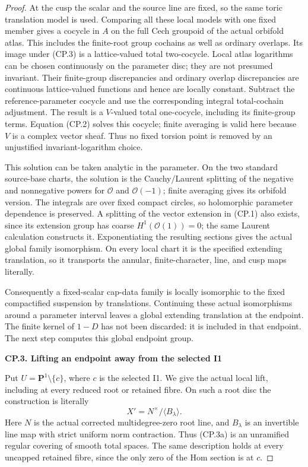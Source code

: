 \begin{proof}
At the cusp the scalar and the source line are fixed, so the same
toric translation model is used. Comparing all these local models
with one fixed member gives a cocycle in \(A\) on the full Cech
groupoid of the actual orbifold atlas. This includes the finite-root
group cochains as well as ordinary overlaps. Its image under (CP.3)
is a lattice-valued total two-cocycle. Local atlas logarithms can be
chosen continuously on the parameter disc; they are not presumed
invariant. Their finite-group discrepancies and ordinary overlap
discrepancies are continuous lattice-valued functions and hence are
locally constant. Subtract the reference-parameter cocycle and use
the corresponding integral total-cochain adjustment. The result is
a \(V\)-valued total one-cocycle, including its finite-group terms.
Equation (CP.2) solves this cocycle; finite averaging is valid here
because \(V\) is a complex vector sheaf. Thus no fixed torsion point is
removed by an unjustified invariant-logarithm choice.

This solution can be taken analytic in the parameter. On the two
standard source-base charts, the solution is the Cauchy/Laurent
splitting of the negative and nonnegative powers for \(\mathcal O\) and \(\mathcal O(-1)\);
finite averaging gives its orbifold version. The integrals are over
fixed compact circles, so holomorphic parameter dependence is
preserved. A splitting of the vector extension in (CP.1) also exists,
since its extension group has coarse \(H^1(\mathcal O(1))=0\); the same Laurent
calculation constructs it. Exponentiating the resulting sections
gives the actual global family isomorphism. On every local chart it
is the specified extending translation, so it transports the
annular, finite-character, line, and cusp maps literally.

Consequently a fixed-scalar cap-data family is locally isomorphic to
the fixed compactified suspension by translations. Continuing these
actual isomorphisms around a parameter interval leaves a global
extending translation at the endpoint. The finite kernel of \(1-D\)
has not been discarded: it is included in that endpoint. The next
step computes this global endpoint group.

\par

\medskip\noindent\textbf{CP.3. Lifting an endpoint away from the selected I1}

\par\nobreak

Put \(U=\mathbf P^1\setminus\{c\}\), where \(c\) is the selected
I1. We give the actual local lift, including at every reduced root or
retained fibre. On such a root disc the construction is literally
\[
              X'=N^\times/\langle B_\lambda\rangle .
                                                               \tag{CP.3a}
\]
Here \(N\) is the actual corrected multidegree-zero root line, and
\(B_\lambda\) is an invertible line map with strict uniform norm
contraction. Thus (CP.3a) is an unramified regular covering of smooth
total spaces. The same description holds at every uncapped retained
fibre, since the only zero of the Hom section is at \(c\).


\end{proof}
